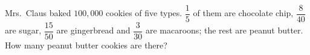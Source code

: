 Mrs.\ Claus baked $100{,}000$ cookies of five types. $\dfrac{1}{5}$ of them are chocolate chip, $\dfrac{8}{40}$ are sugar, $\dfrac{15}{50}$ are gingerbread and $\dfrac{3}{30}$ are macaroons; the rest are peanut butter. How many peanut butter cookies are there?
